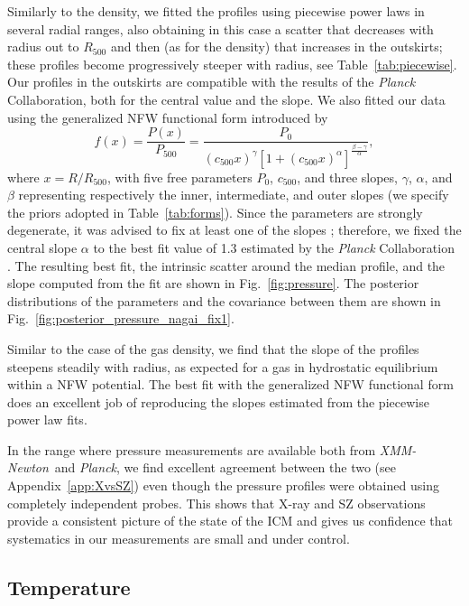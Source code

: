 \documentclass[traditabstract   ]{aa} %
\newcommand{\xmm}{{\it XMM-Newton}}
\newcommand{\planck}{{\it Planck}}
\begin{document}
Similarly to the density, we fitted the profiles using piecewise power laws in several radial ranges, also obtaining  in this case a scatter that decreases with radius {out to $R_{500}$ and then (as for the density) that increases in the outskirts}; these profiles become progressively steeper with radius{, see Table~\ref{tab:piecewise}}. Our profiles in the outskirts are compatible with the results of the \textit{Planck} Collaboration, both for the central value and the slope. We also fitted  our data using the generalized NFW functional form introduced by \citet{nagai+07}
\begin{equation}
f(x) = \frac{P(x)}{P_{500}} = \frac{P_0}{(c_{500}x)^\gamma [1+(c_{500}x)^\alpha]^{\frac{\beta-\gamma}{\alpha}}},  
\label{eq:nagai}
\end{equation}
where $x = R/R_{500}$, with five free parameters $P_0$, $c_{500}$, and three slopes, $\gamma$, $\alpha$, and $\beta$ representing respectively the inner, intermediate, and outer slopes (we specify the priors adopted in Table~\ref{tab:forms}).
Since the parameters are strongly degenerate, it was advised  to fix at least one of the slopes \citep{arnaud+10}; therefore, we fixed the central slope $\alpha$ to the best fit value of 1.3 estimated by the \textit{Planck} Collaboration \citep{planck+13}. The resulting best fit, the intrinsic scatter around the median profile, and the slope computed from the fit are shown in Fig.~\ref{fig:pressure}. The posterior distributions of the parameters and the covariance between them are shown in Fig.~\ref{fig:posterior_pressure_nagai_fix1}. 

Similar to the case of the gas density, we find that the slope of the profiles steepens steadily with radius, as expected for a gas in hydrostatic equilibrium within a NFW potential. The best fit with the generalized NFW functional form does an excellent job of reproducing the slopes estimated from the piecewise power law fits. 

In the range where pressure measurements are available both from \xmm\ and \planck, we find  excellent agreement between the two (see Appendix~\ref{app:XvsSZ}) even though the pressure profiles were obtained using completely independent probes. This shows that X-ray and SZ observations provide a consistent picture of the state of the ICM and gives us confidence that systematics in our measurements are small and under control.

\subsection{Temperature}
\label{sec:temperature}
\end{document}
